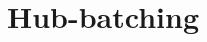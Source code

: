 \documentclass{article}
\begin{document}


\section{Hub-batching}
\label{sec:method}
\end{document}
